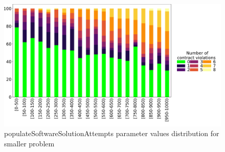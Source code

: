 \begin{figure}
	\centering
	\includegraphics[width=\textwidth]{images/DistrValiditySmall/populateSoftwareSolutionAttempts.pdf}
	\caption[populateSoftwareSolutionAttempts parameter values distribution for smaller problem]{populateSoftwareSolutionAttempts parameter values distribution for smaller problem}
	\label{fig:populateSoftwareSolutionAttempts_DistSmall}
\end{figure}